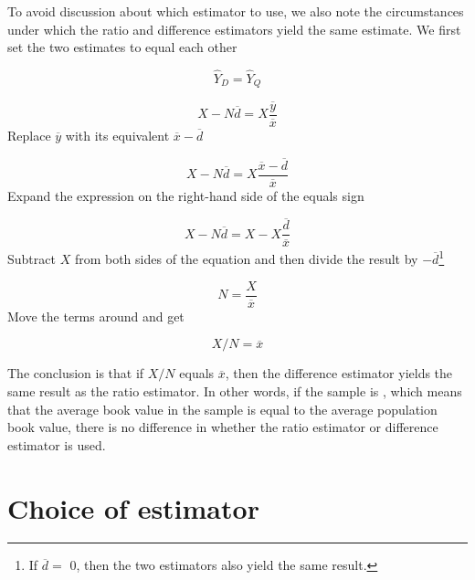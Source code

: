 To avoid discussion about which estimator to use, we also note the circumstances under which the ratio and difference estimators yield the same estimate. We first set the two estimates to equal each other

\begin{equation*}
\hat{Y}_D = \hat{Y}_Q
\end{equation*}

\begin{equation*}
X - N \overline{d} = X \frac{\overline{y}}{\overline{x}}
\end{equation*}
Replace $\overline{y}$ with its equivalent $\overline{x} - \overline{d}$

\begin{equation*}
X - N \overline{d} = X \frac{\overline{x} - \overline{d}}{\overline{x}}
\end{equation*}
Expand the expression on the right-hand side of the equals sign

\begin{equation*}
X - N \overline{d} = X - X\frac{\overline{d}}{\overline{x}}
\end{equation*}
Subtract $X$ from both sides of the equation and then divide the result by $-\overline{d}$\footnote{If $\overline{d} = $ 0, then the two estimators also yield the same result.}

\begin{equation*}
N = \frac{X}{\overline{x}}
\end{equation*}
Move the terms around and get

\begin{equation*}
X/N = \overline{x}
\end{equation*}

The conclusion is that if $X / N$ equals $\overline{x}$, then the difference estimator yields the same result as the ratio estimator. In other words, if the sample is , which means that the average book value in the sample is equal to the average population book value, there is no difference in whether the ratio estimator or  difference estimator is used.


\section{Choice of estimator} %
\label{sec:choice_of_estimator}

